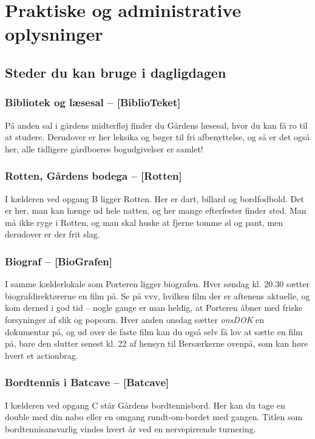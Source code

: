 \documentclass[11pt,article,twoside,openany,danish,extrafontsizes]{memoir} %
\begin{document}
\clearpage


\chapter{Praktiske og administrative oplysninger}
\label{chap:prak}

\section{Steder du kan bruge i dagligdagen}

\subsection{Bibliotek og læsesal -- [BiblioTeket]}
På anden sal i gårdens midterfløj finder du Gårdens læsesal, hvor du kan få ro til at studere. Derudover er her leksika og bøger til fri afbenyttelse, og så er det også her, alle tidligere gårdboeres bogudgivelser er samlet!

\subsection{Rotten, Gårdens bodega -- [Rotten]}
I kælderen ved opgang B ligger Rotten. Her er dart, billard og bordfodbold. Det er her, man kan hænge ud hele natten, og her mange efterfester finder sted. Man må ikke ryge i Rotten, og man skal huske at fjerne tomme øl og pant, men derudover er der frit slag.

\subsection{Biograf -- [BioGrafen]}
I samme kælderlokale som Porteren ligger biografen. Hver søndag kl. 20.30 sætter biografdirektørerne en film på. Se på vvv, hvilken film der er aftenens aktuelle, og kom derned i god tid -- nogle gange er man heldig, at Porteren åbner med friske forsyninger af slik og popcorn. Hver anden onsdag sætter \emph{onsDOK} en dokumentar på, og ud over de faste film kan du også selv få lov at sætte en film på, bare den slutter senest kl. 22 af hensyn til Bersærkerne ovenpå, som kan høre hvert et actionbrag.

\subsection{Bordtennis i Batcave -- [Batcave]}
I kælderen ved opgang C står Gårdens bordtennisbord. Her kan du tage en double med din nabo eller en omgang rundt-om-bordet med gangen. Titlen som bordtennisansvarlig vindes hvert år ved en nervepirrende turnering.
\end{document}
